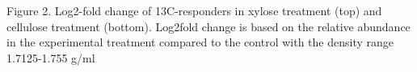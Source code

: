 Figure 2. Log2-fold change of 13C-responders in xylose treatment (top) and cellulose treatment (bottom). Log2fold change is based on the relative abundance in the experimental treatment compared to the control with the density range 1.7125-1.755 g/ml
